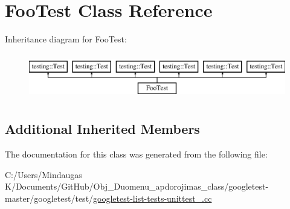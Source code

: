 \hypertarget{class_foo_test}{}\section{Foo\+Test Class Reference}
\label{class_foo_test}
Inheritance diagram for Foo\+Test\+:\begin{figure}[H]
\begin{center}
\leavevmode
\includegraphics[height=2.000000cm]{d8/d1a/class_foo_test}
\end{center}
\end{figure}
\subsection*{Additional Inherited Members}


The documentation for this class was generated from the following file\+:\begin{DoxyCompactItemize}
\item 
C\+:/\+Users/\+Mindaugas K/\+Documents/\+Git\+Hub/\+Obj\+\_\+\+Duomenu\+\_\+apdorojimas\+\_\+class/googletest-\/master/googletest/test/\mbox{\hyperlink{googletest-master_2googletest_2test_2googletest-list-tests-unittest___8cc}{googletest-\/list-\/tests-\/unittest\+\_\+.\+cc}}\end{DoxyCompactItemize}
